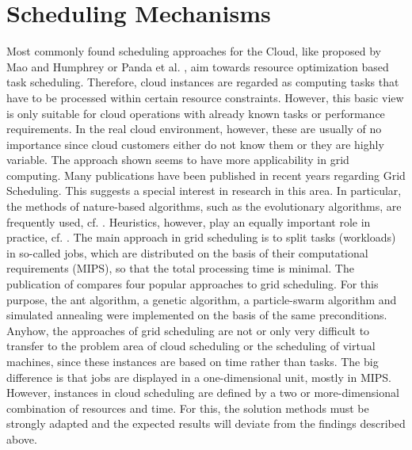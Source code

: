 \section{Scheduling Mechanisms}
Most commonly found scheduling approaches for the Cloud, like proposed by Mao and Humphrey  \cite{6114435} or Panda et al.  \cite{PANDA2015176}, aim towards resource optimization based task scheduling. Therefore, cloud instances are regarded as computing tasks that have to be processed within certain resource constraints. However, this basic view is only suitable for cloud operations with already known tasks or performance requirements. In the real cloud environment, however, these are usually of no importance since cloud customers either do not know them or they are highly variable. The approach shown seems to have more applicability in grid computing. Many publications have been published in recent years regarding Grid Scheduling. This suggests a special interest in research in this area. In particular, the methods of nature-based algorithms, such as the evolutionary algorithms, are frequently used, cf.  \cite{tlda}  \cite{Ga-grid-2}. Heuristics, however, play an equally important role in practice, cf.  \cite{riskheuristik}. The main approach in grid scheduling is to split tasks (workloads) in so-called jobs, which are distributed on the basis of their computational requirements (MIPS), so that the total processing time is minimal. The publication of  \cite{4heurisitken} compares four popular approaches to grid scheduling. For this purpose, the ant algorithm, a genetic algorithm, a particle-swarm algorithm and simulated annealing were implemented on the basis of the same preconditions. Anyhow, the approaches of grid scheduling are not or only very difficult to transfer to the problem area of cloud scheduling or the scheduling of virtual machines, since these instances are based on time rather than tasks. The big difference is that jobs are displayed in a one-dimensional unit, mostly in MIPS. However, instances in cloud scheduling are defined by a two or more-dimensional combination of resources and time. For this, the solution methods must be strongly adapted and the expected results will deviate from the findings described above.

